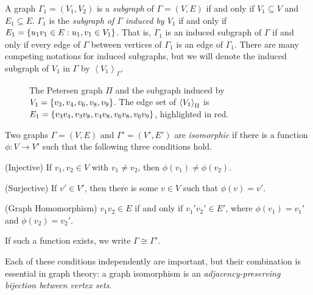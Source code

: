 \documentclass[m3380-lec-main.tex]{subfiles}
\begin{document}
\begin{defn} A graph $\Gamma_1=(V_1, V_2)$ is a \emph{subgraph} of $\Gamma=(V,E)$ if and only if $V_1\subseteq V$ and $E_1\subseteq E$. $\Gamma_1$ is the \emph{subgraph of $\Gamma$ induced by $V_1$} if and only if $E_1 = \left\{u_1v_1\in E: u_1,v_1\in V_1\right\}$. That is, $\Gamma_1$ is an induced subgraph of $\Gamma$ if and only if every edge of $\Gamma$ between vertices of $\Gamma_1$ is an edge of $\Gamma_1$. There are many competing notations for induced subgraphs, but we will denote the induced subgraph of $V_1$ in $\Gamma$ by $\left\langle V_1\right\rangle_\Gamma$.
\end{defn}

\begin{figure}[hbt]\begin{center}\end{center}
\caption{The Petersen graph $\Pi$ and the subgraph induced by ${V_1=\left\{v_3,v_4,v_6,v_8,v_9\right\}}$. The edge set of $\left\langle V_1\right\rangle_\Pi$ is $E_1 = \left\{v_3v_4, v_3v_8, v_4v_8, v_6v_8, v_6v_9\right\}$, highlighted in red.}
\end{figure}


\begin{defn}\label{defn:isom} Two graphs $\Gamma=(V,E)$ and $\Gamma'=(V',E')$ are \emph{isomorphic} if there is a function $\phi:V\to V'$ such that the following three conditions hold. 
\begin{enum}
\item (Injective) If $v_1,v_2\in V$ with $v_1\neq v_2$, then $\phi(v_1)\neq\phi(v_2)$.
\item (Surjective) If $v'\in V'$, then there is some $v\in V$ such that $\phi(v)=v'$.
\item (Graph Homomorphism) $v_1v_2\in E$ if and only if $v_1'v_2'\in E'$, where $\phi(v_1)=v_1'$ and $\phi(v_2)=v_2'$.
\end{enum}
If such a function exists, we write $\Gamma\cong \Gamma'$.
\end{defn}
Each of these conditions independently are important, but their combination is essential in graph theory: a graph isomorphism is an \emph{adjacency-preserving bijection between vertex sets}.
\end{document}
